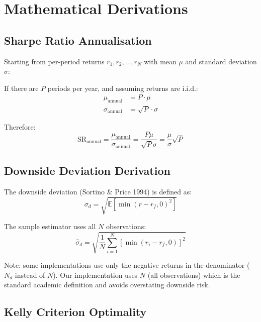 \documentclass[12pt,a4paper]{report}
\theoremstyle{definition}
\newcommand{\E}{\mathbb{E}}
\begin{document}
\appendix

\chapter{Mathematical Derivations}
\label{app:derivations}

\section{Sharpe Ratio Annualisation}

Starting from per-period returns $r_1, r_2, \ldots, r_N$ with mean $\mu$ and standard deviation $\sigma$:

If there are $P$ periods per year, and assuming returns are i.i.d.:
\begin{align}
    \mu_{\text{annual}} &= P \cdot \mu \\
    \sigma_{\text{annual}} &= \sqrt{P} \cdot \sigma
\end{align}

Therefore:
\begin{equation}
    \text{SR}_{\text{annual}} = \frac{\mu_{\text{annual}}}{\sigma_{\text{annual}}} = \frac{P\mu}{\sqrt{P}\sigma} = \frac{\mu}{\sigma}\sqrt{P}
\end{equation}

\section{Downside Deviation Derivation}

The downside deviation (Sortino \& Price 1994) is defined as:
\begin{equation}
    \sigma_d = \sqrt{\E[\min(r - r_f, 0)^2]}
\end{equation}

The sample estimator uses all $N$ observations:
\begin{equation}
    \hat{\sigma}_d = \sqrt{\frac{1}{N}\sum_{i=1}^{N}[\min(r_i - r_f, 0)]^2}
\end{equation}

Note: some implementations use only the negative returns in the denominator ($N_d$ instead of $N$). Our implementation uses $N$ (all observations) which is the standard academic definition and avoids overstating downside risk.

\section{Kelly Criterion Optimality}
\end{document}

